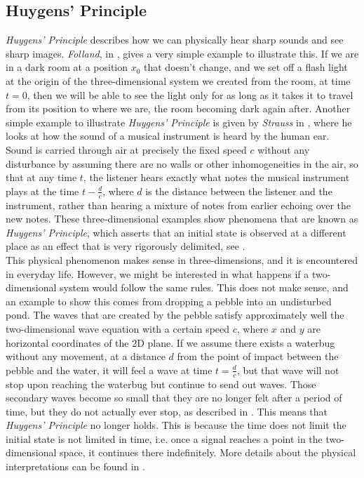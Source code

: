 \documentclass[a4paper, 12pt]{article}
\numberwithin{equation}{section}
\begin{document}
\subsection{Huygens' Principle}
\emph{Huygens' Principle} describes how we can physically hear sharp sounds and
see sharp images. \emph{Folland}, in \cite{Fol}, gives a very simple example to
illustrate this. If we are in a dark room at a position $x_0$ that doesn't
change, and we set off a flash light at the origin of the three-dimensional
system we created from the room, at time $t=0$, then we will be able to see the
light only for as long as it takes it to travel from its position to where we
are, the room becoming dark again after. Another simple example to illustrate
\emph{Huygens' Principle} is given by \emph{Strauss} in \cite{Str}, where he
looks at how the sound of a musical instrument is heard by the human ear. Sound
is carried through air at precisely the fixed speed $c$ without any disturbance
by assuming there are no walls or other inhomogeneities in the air, so that at
any time $t$, the listener hears exactly what notes the musical instrument plays
at the time $t-\frac{d}{c}$, where $d$ is the distance between the listener and
the instrument, rather than hearing a mixture of notes from earlier echoing over
the new notes. These three-dimensional examples show phenomena that are known as
\emph{Huygens' Principle}, which asserts that an initial state is observed at a
different place as an effect that is very rigorously delimited, see \cite{Hil} .
\\

This physical phenomenon makes sense in three-dimensions, and it is encountered
in everyday life. However, we might be interested in what happens if a
two-dimensional system would follow the same rules. This does not make sense,
and an example to show this comes from dropping a pebble into an undisturbed
pond. The waves that are created by the pebble satisfy approximately well the
two-dimensional wave equation with a certain speed $c$, where $x$ and $y$ are
horizontal coordinates of the 2D plane. If we assume there exists a waterbug
without any movement, at a distance $d$ from the point of impact between the
pebble and the water, it will feel a wave at time $t=\frac{d}{c}$, but that wave
will not stop upon reaching the waterbug but continue to send out waves. Those
secondary waves become so small that they are no longer felt after a period of
time, but they do not actually ever stop, as described in \cite{Str}. This means
that \emph{Huygens' Principle} no longer holds. This is because the time does
not limit the initial state is not limited in time, i.e. once a signal reaches a
point in the two-dimensional space, it continues there indefinitely. More
details about the physical interpretations can be found in \cite{Hil}. \\
\end{document}

